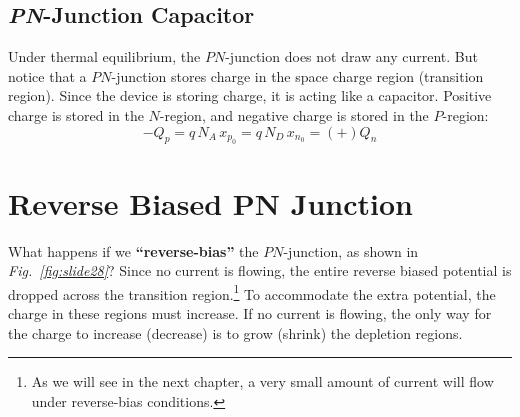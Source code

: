 \subsection{\emph{PN}-Junction Capacitor}
Under thermal equilibrium, the $PN$-junction does not draw any current.   But notice that a $PN$-junction stores charge in the space charge region (transition region).   Since the device is storing charge, it is acting like a capacitor.  Positive charge is stored in the $N$-region, and negative charge is stored in the $P$-region:
    \begin{equation} 
        -Q_p = q\,N_A\,x_{p_0} = q\,N_D\,x_{n_0} = (+)Q_n
    \end{equation}
\section{Reverse Biased PN Junction}
What happens if we \textbf{“reverse-bias”} the $PN$-junction, as shown in \emph{Fig.~\ref{fig:slide28}}?  Since no current is flowing, the entire reverse biased potential is dropped across the transition region.\footnote{As we will see in the next chapter, a very small amount of current will flow under reverse-bias conditions.}  To accommodate the extra potential, the charge in these regions must increase.  If no current is flowing, the only way for the charge to increase (decrease) is to grow (shrink) the depletion regions.
